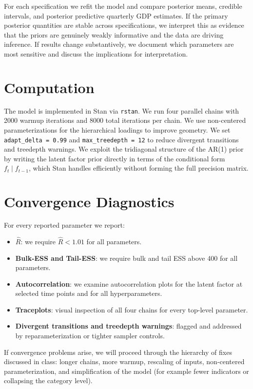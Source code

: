 \documentclass[11pt]{article}
\begin{document}
For each specification we refit the model and compare posterior means, credible intervals, and posterior predictive quarterly GDP estimates. If the primary posterior quantities are stable across specifications, we interpret this as evidence that the priors are genuinely weakly informative and the data are driving inference. If results change substantively, we document which parameters are most sensitive and discuss the implications for interpretation.

\section{Computation}

The model is implemented in Stan via \texttt{rstan}. We run four parallel chains with 2000 warmup iterations and 8000 total iterations per chain. We use non-centered parameterizations for the hierarchical loadings to improve geometry. We set \texttt{adapt\_delta = 0.99} and \texttt{max\_treedepth = 12} to reduce divergent transitions and treedepth warnings. We exploit the tridiagonal structure of the AR(1) prior by writing the latent factor prior directly in terms of the conditional form $f_t \mid f_{t-1}$, which Stan handles efficiently without forming the full precision matrix.

\section{Convergence Diagnostics}

For every reported parameter we report:
\begin{itemize}[nosep]
  \item \textbf{$\hat{R}$}: we require $\hat{R} < 1.01$ for all parameters.
  \item \textbf{Bulk-ESS and Tail-ESS}: we require bulk and tail ESS above 400 for all parameters.
  \item \textbf{Autocorrelation}: we examine autocorrelation plots for the latent factor at selected time points and for all hyperparameters.
  \item \textbf{Traceplots}: visual inspection of all four chains for every top-level parameter.
  \item \textbf{Divergent transitions and treedepth warnings}: flagged and addressed by reparameterization or tighter sampler controls.
\end{itemize}

If convergence problems arise, we will proceed through the hierarchy of fixes discussed in class: longer chains, more warmup, rescaling of inputs, non-centered parameterization, and simplification of the model (for example fewer indicators or collapsing the category level).
\end{document}
